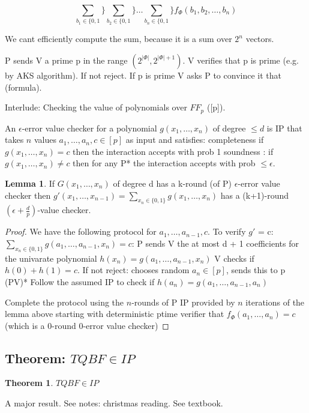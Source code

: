 \documentclass[a4paper,12pt]{article}
\theoremstyle{definition}
\newtheorem{lemma}[counter]{Lemma}
\newtheorem{theorem}[counter]{Theorem}
\theoremstyle{remark}
\begin{document}
\begin{equation*}
    \sum_{b_1 \in \{0, 1}\} \sum_{b_2 \in \{0, 1}\} \dots \sum_{b_n \in \{0, 1}\} f_{\Phi} (b_1, b_2, \dots, b_n)
\end{equation*}

We cant efficiently compute the sum, because it is a sum over $2^n$ vectors.

P sends V a prime p in the range $(2^{|\Phi|}, 2^{|\Phi|+1})$.
V verifies that p is prime (e.g. by AKS algorithm). If not reject.
If p is prime V asks P to convince it that (formula).

Interlude: Checking the value of polynomials over $FF_p$ ([p]).

An $\epsilon$-error value checker for a polynomial $g(x_1, \dots, x_n)$ of degree $\leq d$ is IP that takes $n$ values $a_1, \dots, a_n, c \in [p]$
as input and satisfies:
completeness if $g(x_1, \dots, x_n) = c$ then the interaction accepts with prob 1
soundness : if $g(x_1, \dots, x_n) \neq c$ then for any P* the interaction accepts with prob $\leq \epsilon$.

\begin{lemma}
    If $G(x_1, \dots, x_n)$ of degree d has a k-round (of P) $\epsilon$-error value checker then
    $g'(x_1, \dots, x_{n-1}) = \sum_{x_n \in \{0, 1\}} g(x_1, \dots, x_n)$ has a (k+1)-round
    $(\epsilon + \frac{d}{p})$-value checker.
\end{lemma}

\begin{proof}
    We have the following protocol for $a_1, \dots, a_{n-1}, c$. To verify $g'$ = c: $\sum_{x_n \in \{0, 1\}} g(a_1, \dots, a_{n-1}, x_n) = c$:
    P sends V the at most d + 1 coefficients for the univarate polynomial $h(x_n) = g(a_1, \dots, a_{n-1}, x_n)$
    V checks if $h(0) + h(1) = c$. If not reject:
    chooses random $a_n \in [p]$, sends this to p
    (PV)* Follow the assumed IP to check if $h(a_n) = g(a_1, \dots, a_{n-1}, a_n)$

    Complete the protocol using the $n$-rounds of P IP provided by $n$ iterations of the lemma above starting with deterministic ptime verifier that
    $f_{\Phi} (a_1, \dots, a_n) = c$ (which is a 0-round 0-error value checker)
\end{proof}


\subsection{Theorem: $TQBF \in IP$}
\begin{theorem}
    $TQBF \in IP$
\end{theorem}
A major result. See notes: christmas reading. See textbook.
\end{document}
